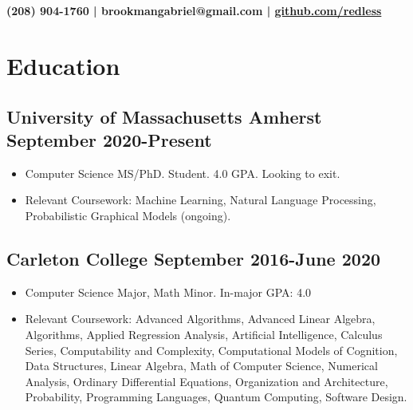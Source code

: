 \documentclass[12pt]{article}
\begin{document}
{\selectfont

\section*{}
\begin{center}\textbf{(208) 904-1760 | brookmangabriel@gmail.com | \href{https://github.com/redless}{github.com/redless}}\end{center}
\section*{Education}

\subsection*{University of Massachusetts Amherst \hfill September 2020-Present} 
  \begin{itemize}

  \item Computer Science MS/PhD. Student. 4.0 GPA. Looking to exit.
\item
  Relevant Coursework: Machine Learning, Natural Language Processing, Probabilistic Graphical Models (ongoing).

\end{itemize}

  \subsection*{Carleton College \hfill September 2016-June 2020} 
  \begin{itemize}

  \item Computer Science Major, Math Minor. In-major GPA: 4.0
\item
  Relevant Coursework: Advanced Algorithms, Advanced Linear Algebra, Algorithms, Applied Regression Analysis, Artificial Intelligence, Calculus Series, Computability and Complexity, Computational Models of Cognition, Data Structures, Linear Algebra, Math of Computer Science, Numerical Analysis, Ordinary Differential Equations, Organization and
  Architecture, Probability, Programming Languages, Quantum Computing, Software Design.
  


\end{itemize}}
\end{document}
